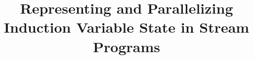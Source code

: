 \documentclass[]{IEEEtran}
\begin{document}


\title{Representing and Parallelizing Induction Variable State in Stream Programs}


\maketitle
\begin{abstract}

\end{abstract}













%
%
%
%
%
%
%
%

%


\footnotesize



\clearpage
\end{document}
